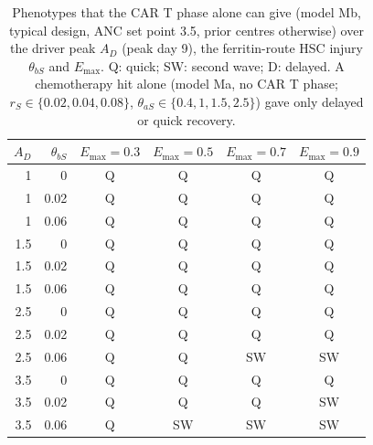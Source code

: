 \begin{table}[!htbp]
\centering
\small
\setlength{\tabcolsep}{3.5pt}
\caption{Phenotypes that the CAR T phase alone can give (model Mb, typical design, ANC set point 3.5, prior centres otherwise) over the driver peak $A_D$ (peak day 9), the ferritin-route HSC injury $\theta_{bS}$ and $E_{\max}$. Q: quick; SW: second wave; D: delayed. A chemotherapy hit alone (model Ma, no CAR T phase; $r_S\in\{0.02,0.04,0.08\}$, $\theta_{aS}\in\{0.4,1,1.5,2.5\}$) gave only delayed or quick recovery.}
\label{tab:screen}
\begin{tabular}{rrcccc}
\toprule
$A_D$ & $\theta_{bS}$ & $E_{\max}=0.3$ & $E_{\max}=0.5$ & $E_{\max}=0.7$ & $E_{\max}=0.9$ \\
\midrule
1 & 0 & Q & Q & Q & Q \\
1 & 0.02 & Q & Q & Q & Q \\
1 & 0.06 & Q & Q & Q & Q \\
1.5 & 0 & Q & Q & Q & Q \\
1.5 & 0.02 & Q & Q & Q & Q \\
1.5 & 0.06 & Q & Q & Q & Q \\
2.5 & 0 & Q & Q & Q & Q \\
2.5 & 0.02 & Q & Q & Q & Q \\
2.5 & 0.06 & Q & Q & SW & SW \\
3.5 & 0 & Q & Q & Q & Q \\
3.5 & 0.02 & Q & Q & Q & SW \\
3.5 & 0.06 & Q & SW & SW & SW \\
\bottomrule
\end{tabular}
\end{table}
